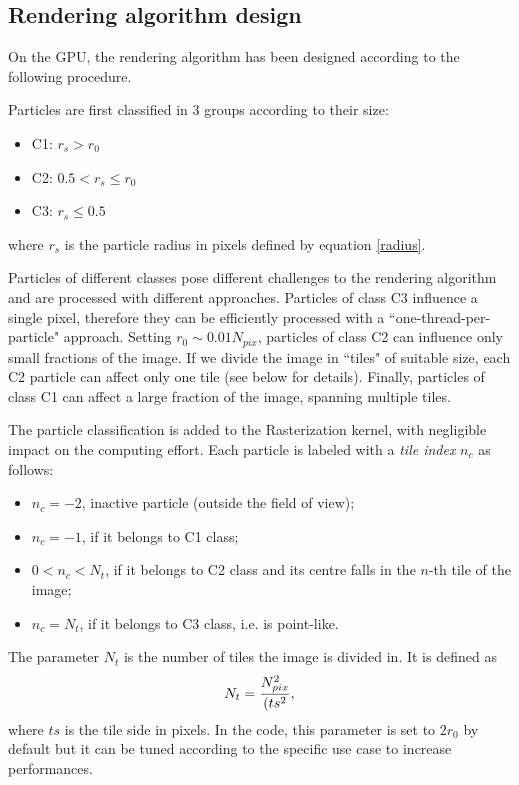 \documentclass[11pt]{article}
\begin{document}
\subsection{Rendering algorithm design}

On the GPU, the rendering algorithm has been designed according to the following procedure.

Particles are first classified in 3 groups according to their size:
\begin{itemize}
\item 
C1: $r_s > r_0$
\item
C2: $0.5 < r_s \le r_0$
\item
C3: $r_s \le 0.5$
\end{itemize}
where $r_s$ is the particle radius in pixels defined by equation \eqref{radius}.

Particles of different classes pose different challenges to the rendering 
algorithm and are processed with different approaches. Particles of class C3 
influence a single pixel, therefore they can be efficiently 
processed with a ``one-thread-per-particle" approach. Setting $r_0 \sim 0.01 N_{pix}$, 
particles of class C2 can influence only small fractions of the image. If 
we divide the image in ``tiles" of suitable size, each C2 particle can affect 
only one tile (see below for details). Finally, particles of class C1 can affect 
a large fraction of the image, spanning multiple tiles.

The particle classification is added to the Rasterization kernel, with negligible impact
on the computing effort. Each particle is labeled
with a {\it tile index} $n_c$ as follows:
\begin{itemize}
\item 
$n_c = -2$, inactive particle (outside the field of view);
\item
$n_c = -1$, if it belongs to C1 class; 
\item
$0 < n_c < N_t$, if it belongs to C2 class and its centre falls in the $n$-th tile of the image;  
\item
$n_c = N_t$, if it belongs to C3 class, i.e. is point-like.
\end{itemize}
The parameter $N_t$ is the number of tiles the image is divided in. It is defined as
\begin{equation}
N_t = {N_{pix}^2\over (ts^2},   
\end{equation}
where $ts$ is the tile side in pixels. In the code, this parameter is set to $2r_0$ by default but it can be tuned according to the specific use case to increase performances. 
\end{document}
